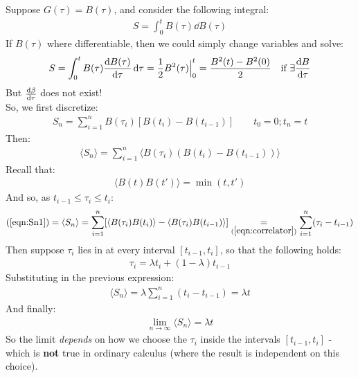 \documentclass[../template.tex]{subfiles}
\begin{document}
\begin{example}[a]
    Suppose $G(\tau) = B(\tau)$, and consider the following integral:
    \begin{align*}
        S = \int_0^t B(\tau) \dd{B(\tau)}
    \end{align*} 
    If $B(\tau)$ where differentiable, then we could simply change variables and solve:
    \begin{align*}
        S = \int_0^t B(\tau) \dv{B(\tau)}{\tau} \dd{\tau} = \frac{1}{2} B^2(\tau) \Big|_0^t = \frac{B^2(t) - B^2(0)}{2} \quad \text{if } \exists \dv{B}{\tau}  
    \end{align*} 
    But $\dv{\beta}{\tau}$ does not exist!\\
    So, we first discretize:
    \begin{align}
        S_n = \sum_{i=1}^n B(\tau_i) [B(t_i) - B(t_{i-1})] \qquad t_0 = 0; t_n = t
        \label{eqn:Sn1}
    \end{align} 
    Then:
    \begin{align*}
        \langle S_n \rangle = \sum_{i=1}^{n} \langle B(\tau_i) (B(t_i) - B(t_{i-1})) \rangle
    \end{align*}
    Recall that:
    \begin{align}
        \langle B(t) B(t') \rangle = \min(t,t')
        \label{eqn:correlator}
    \end{align}
    And so, as $t_{i-1} \leq \tau_i \leq t_i$: 
    \begin{align*}
        (\ref{eqn:Sn1}) = \langle S_n \rangle = \sum_{i=1}^n [\langle B(\tau_i) B(t_i) \rangle - \langle B(\tau_i) B(t_{i-1}) \rangle] \underset{(\ref{eqn:correlator})}{=}  \sum_{i=1}^n (\tau_i - t_{i-1}) 
    \end{align*}
    Then suppose $\tau_i$ lies in  at every interval $[t_{i-1},t_i]$, so that the following holds:  
    \begin{align*}
        \tau_i = \lambda t_i + (1- \lambda) t_{i-1}
    \end{align*}
    Substituting in the previous expression:
    \begin{align*}
        \langle S_n \rangle = \lambda \sum_{i=1}^n (t_i - t_{i-1}) = \lambda t
    \end{align*}
    And finally:
    \begin{align*}
        \lim_{n \to \infty} \langle S_n \rangle = \lambda t
    \end{align*}
    So the limit \textit{depends} on how we choose the $\tau_i$ inside the intervals $[t_{i-1}, t_i]$ - which is \textbf{not} true in ordinary calculus (where the result is independent on this choice).\\

\end{example}
\end{document}
